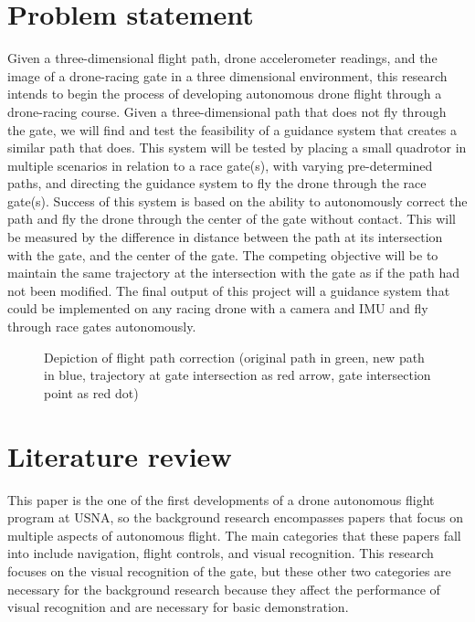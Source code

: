\documentclass[onecolumn,10pt]{IEEEtran}
\newcommand{\myroot}{../}
\begin{document}
\section{Problem statement}
Given a three-dimensional flight path, drone accelerometer readings, and the image of a drone-racing gate in a three dimensional environment, this research intends to begin the process of developing autonomous drone flight through a drone-racing course. Given a three-dimensional path that does not fly through the gate, we will find and test the feasibility of a guidance system that creates a similar path that does. This system will be tested by placing a small quadrotor in multiple scenarios in relation to a race gate(s), with varying pre-determined paths, and directing the guidance system to fly the drone through the race gate(s). Success of this system is based on the ability to autonomously correct the path and fly the drone through the center of the gate without contact. This will be measured by the difference in distance between the path at its intersection with the gate, and the center of the gate. The competing objective will be to maintain the same trajectory at the intersection with the gate as if the path had not been modified. The final output of this project will a guidance system that could be implemented on any racing drone with a camera and IMU and fly through race gates autonomously.

\begin{figure}
\caption{Depiction of flight path correction (original path in green, new path in blue, trajectory at gate intersection as red arrow, gate intersection point as red dot)}
\label{fig-problem-statement}
\end{figure}

%




\section{Literature review}
This paper is the one of the first developments of a drone autonomous flight program at USNA, so the background research encompasses papers that focus on multiple aspects of autonomous flight. The main categories that these papers fall into include navigation, flight controls, and visual recognition. This research focuses on the visual recognition of the gate, but these other two categories are necessary for the background research because they affect the performance of visual recognition and are necessary for basic demonstration. 
\end{document}
